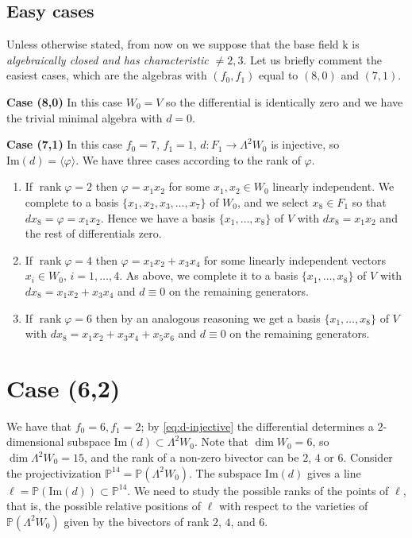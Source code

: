 \documentclass[10pt,reqno]{amsart}
\newcommand{\la}{\langle}
\newcommand{\ra}{\rangle}
\newcommand{\PP}{\mathbb P}
\DeclareMathOperator{\rank}{rank}
\newcommand{\f}{\varphi}
\renewcommand{\L}{\Lambda}
\newcommand{\kk}{\mathrm{k}}
\newcommand{\tr}[1]{\textrm{#1}}
\theoremstyle{definition}
\begin{document}
\subsection{Easy cases}\label{easy:cases}
Unless otherwise stated, from now on we suppose that the base field $\kk$ is \emph{algebraically closed and has characteristic $\ne 2, 3$}. 
Let us briefly comment the easiest cases, which are the algebras with $(f_0,f_1)$ equal to $(8,0)$ and $(7,1)$.

\noindent \textbf{Case (8,0)} In this case $W_0=V$ so the differential is identically zero and we have the trivial minimal algebra with $d=0$.

\noindent \textbf{Case (7,1)} In this case $f_0=7$, $f_1=1$, $d\colon F_1 \to \L^2 W_0$ is injective, so $\tr{Im}(d)=\la\f\ra$. We have three cases according to the rank of $\f$.
\begin{enumerate}
    \item If $\rank \f=2$ then $\f= x_1x_2 $ for some $x_1, x_2 \in W_0$ linearly independent. We complete to a basis $\{x_1,x_2,x_3,\dots, x_7\}$ of $W_0$, and we select $x_8 \in F_1$ so that $dx_8=\f=x_1x_2$. Hence we have a basis $\{x_1,\ldots,x_8\}$ of $V$ with $dx_8=x_1x_2$ and the rest of differentials zero.
    \item If $\rank \f=4$ then $\f= x_1x_2+x_3x_4$ for some linearly independent vectors $x_i \in W_0$, $i=1,\ldots,4$. As above, we complete it to a basis $\{x_1,\ldots, x_8\}$ of $V$ with $dx_8=x_1x_2+x_3x_4$ and $d\equiv 0$ on the remaining generators.
    \item If $\rank \f=6$ then by an analogous reasoning we get a basis $\{x_1,\ldots, x_8\}$ of $V$ with $dx_8=x_1x_2+x_3x_4+x_5x_6$ and $d\equiv 0$ on the remaining generators.
\end{enumerate}

\section{Case (6,2)}\label{sec:(6,2)}

\noindent We have that $f_0=6, f_1=2$; by \eqref{eq:d-injective} the differential determines a $2$-dimensional subspace $\tr{Im}(d)\subset \L^2 W_0$.
Note that $\dim W_0=6$, so $\dim \L^2 W_0=15$, and the rank of a non-zero bivector can be $2$, $4$ or $6$. Consider the projectivization $\PP^{14}=\PP (\L^2 W_0)$. The subspace $\tr{Im}(d)$ gives a line $\ell=\PP(\tr{Im}(d)) \subset \PP^{14}$. We need to study the possible ranks of the points of $\ell$, that is, the possible relative positions of $\ell$ with respect to the varieties of $\PP(\L^2 W_0)$ given by the bivectors of rank $2$, $4$, and $6$. 
\end{document}
